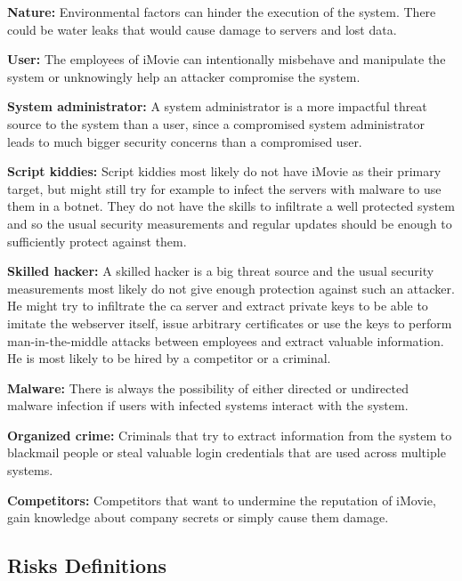 \documentclass[english]{article}
\begin{document}
\begin{description}
\item{\textbf{Nature:}} Environmental factors can hinder the execution of the system. There could be water leaks that would cause damage to servers and lost data.
\item{\textbf{User:}} The employees of iMovie can intentionally misbehave and manipulate the system or unknowingly help an attacker compromise the system.
\item{\textbf{System administrator:}} A system administrator is a more impactful threat source to the system than a user, since a compromised system administrator leads to much bigger security concerns than a compromised user.
\item{\textbf{Script kiddies:}} Script kiddies most likely do not have iMovie as their primary target, but might still try for example to infect the servers with malware to use them in a botnet. They do not have the skills to infiltrate a well protected system and so the usual security measurements and regular updates should be enough to sufficiently protect against them.
\item{\textbf{Skilled hacker:}} A skilled hacker is a big threat source and the usual security measurements most likely do not give enough protection against such an attacker. He might try to infiltrate the ca server and extract private keys to be able to imitate the webserver itself, issue arbitrary certificates or use the keys to perform man-in-the-middle attacks between employees and extract valuable information. He is most likely to be hired by a competitor or a criminal.
\item{\textbf{Malware:}} There is always the possibility of either directed or undirected malware infection if users with infected systems interact with the system.
\item{\textbf{Organized crime:}} Criminals that try to extract information from the system to blackmail people or steal valuable login credentials that are used across multiple systems.
\item{\textbf{Competitors:}} Competitors that want to undermine the reputation of iMovie, gain knowledge about company secrets or simply cause them damage.
\end{description}

\subsection{Risks Definitions}
\end{document}
